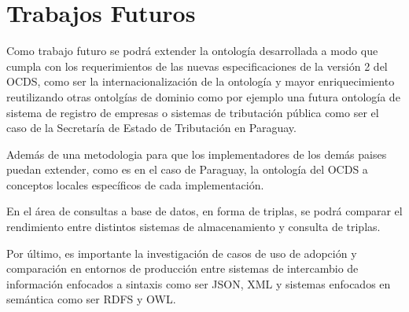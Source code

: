 \section{Trabajos Futuros}
\label{chap:futuros}

Como trabajo futuro se podrá extender la ontología desarrollada a modo que cumpla con los requerimientos de las nuevas especificaciones de la versión 2 del OCDS, como ser la internacionalización de la ontología y mayor enriquecimiento reutilizando otras ontolgías de dominio como por ejemplo una futura ontología de sistema de registro de empresas o sistemas de tributación pública como ser el caso de la Secretaría de Estado de Tributación en Paraguay. 

Además de una metodologia para que los implementadores de los demás paises puedan extender, como es en el caso de Paraguay, la ontología del OCDS a conceptos locales específicos de cada implementación.

En el área de consultas a base de datos, en forma de triplas, se podrá comparar el rendimiento entre distintos sistemas de almacenamiento y consulta de triplas.

Por último, es importante la investigación de casos de uso de adopción y comparación en entornos de producción entre sistemas de intercambio de información enfocados a sintaxis como ser JSON, XML y sistemas enfocados en semántica como ser RDFS y OWL. 